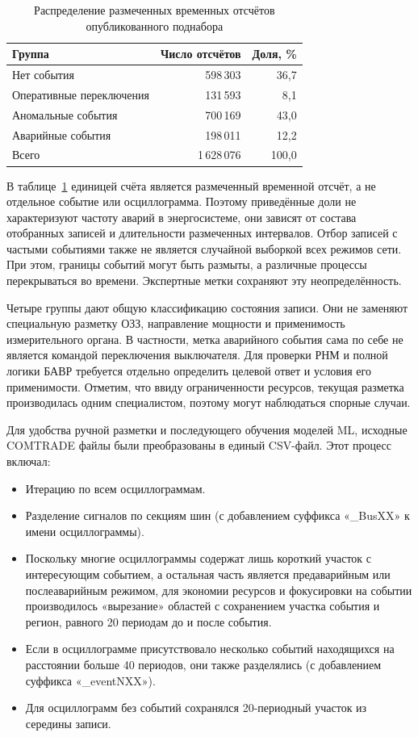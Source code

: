 \begin{table}[htbp]
\centering
\caption{Распределение размеченных временных отсчётов опубликованного поднабора}
\label{tab:ch3_published_annotation_counts}
\begin{tabular}{|l|r|r|}
\hline
Группа & Число отсчётов & Доля, \% \\
\hline
Нет события & 598\,303 & 36,7 \\
Оперативные переключения & 131\,593 & 8,1 \\
Аномальные события & 700\,169 & 43,0 \\
Аварийные события & 198\,011 & 12,2 \\
\hline
Всего & 1\,628\,076 & 100,0 \\
\hline
\end{tabular}
\end{table}

В таблице~\ref{tab:ch3_published_annotation_counts} единицей счёта является
размеченный временной отсчёт, а не отдельное событие или осциллограмма.
Поэтому приведённые доли не характеризуют частоту аварий в энергосистеме,
они зависят от состава отобранных записей и длительности размеченных интервалов.
Отбор записей с частыми событиями также не является случайной выборкой
всех режимов сети. При этом, границы событий могут быть размыты, а различные процессы
перекрываться во времени. Экспертные метки сохраняют эту неопределённость.

Четыре группы дают общую классификацию состояния записи. Они не заменяют
специальную разметку ОЗЗ, направление мощности и применимость измерительного
органа. В частности, метка аварийного события сама по себе не является командой
переключения выключателя. Для проверки РНМ и полной логики БАВР требуется
отдельно определить целевой ответ и условия его применимости.
Отметим, что ввиду ограниченности ресурсов, текущая разметка производилась
одним специалистом, поэтому могут наблюдаться спорные случаи.


Для удобства ручной разметки и последующего обучения моделей ML, исходные COMTRADE файлы
были преобразованы в единый CSV-файл. Этот процесс включал:

\begin{itemize}
  \item Итерацию по всем осциллограммам.
  \item Разделение сигналов по секциям шин (с добавлением суффикса «\_BusXX» к имени осциллограммы).
  \item Поскольку многие осциллограммы содержат лишь короткий участок с интересующим событием, а остальная часть является предаварийным или послеаварийным режимом, для экономии ресурсов и фокусировки на событии производилось «вырезание» областей с сохранением участка события и регион, равного 20 периодам до и после события.
  \item Если в осциллограмме присутствовало несколько событий находящихся на расстоянии больше 40 периодов, они также разделялись (с добавлением суффикса «\_eventNXX»).
  \item Для осциллограмм без событий сохранялся 20-периодный участок из середины записи.
\end{itemize}

